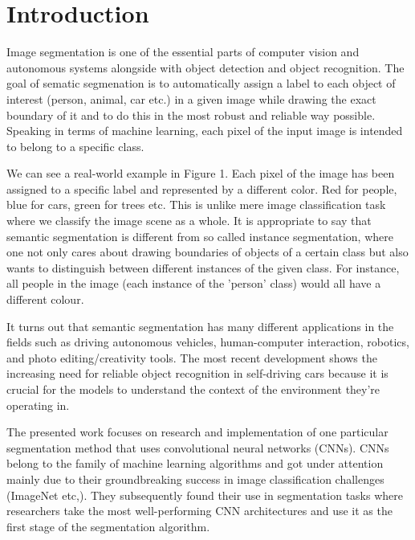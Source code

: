 \chapter{Introduction}
Image segmentation is one of the essential parts of computer vision and autonomous systems alongside with object detection and object recognition. The goal of sematic segmenation is to automatically assign a label to each object of interest (person, animal, car etc.) in a given image while drawing the exact boundary of it and to do this in the most robust and reliable way possible. Speaking in terms of machine learning, each pixel of the input image is intended to belong to a specific class.

We can see a real-world example in Figure 1. Each pixel of the image has been assigned to a specific label and represented by a different color. Red for people, blue for cars, green for trees etc. This is unlike mere image classification task where we classify the image scene as a whole. It is appropriate to say that semantic segmentation is different from so called instance segmentation, where one not only cares about drawing boundaries of objects of a certain class but also wants to distinguish between different instances of the given class. For instance, all people in the image (each instance of the 'person' class) would all have a different colour.

It turns out that semantic segmentation has many different applications in the fields such as driving autonomous vehicles, human-computer interaction, robotics, and photo editing/creativity tools. The most recent development shows the increasing need for reliable object recognition in self-driving cars because it is crucial for the models to understand the context of the environment they’re operating in. %

The presented work focuses on research and implementation of one particular segmentation method that uses convolutional neural networks (CNNs). CNNs belong to the family of machine learning algorithms and got under attention mainly due to their groundbreaking success in image classification challenges (ImageNet etc,). They subsequently found their use in segmentation tasks where researchers take the most well-performing CNN architectures and use it as the first stage of the segmentation algorithm.

